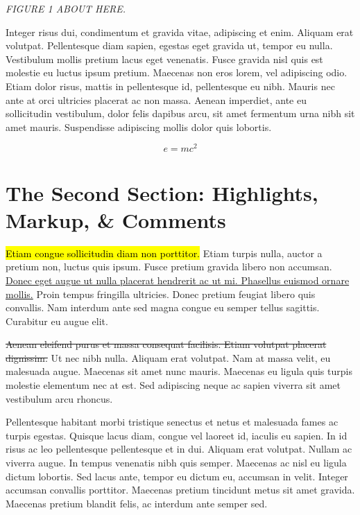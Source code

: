 \vspace{.25in}
\begin{center}
{\LARGE \textit{FIGURE 1 ABOUT HERE.}}
\end{center}

Integer risus dui, condimentum et gravida vitae, adipiscing et enim. Aliquam erat volutpat. \cite{lareau2003} Pellentesque diam sapien, egestas eget gravida ut, tempor eu nulla. Vestibulum mollis pretium lacus eget venenatis. Fusce gravida nisl quis est molestie eu luctus ipsum pretium. Maecenas non eros lorem, vel adipiscing odio. \cite{massey1993} Etiam dolor risus, mattis in pellentesque id, pellentesque eu nibh. Mauris nec ante at orci ultricies placerat ac non massa. Aenean imperdiet, ante eu sollicitudin vestibulum, dolor felis dapibus arcu, sit amet fermentum urna nibh sit amet mauris. \cite{mcpherson2001} Suspendisse adipiscing mollis dolor quis lobortis. \cite{meyer1977}

\begin{equation}
\label{eq:emc}
e = mc^2
\end{equation}

\section*{The Second Section: Highlights, Markup, \& Comments}

\hl{Etiam congue sollicitudin diam non porttitor.} Etiam turpis nulla, auctor a pretium non, luctus quis ipsum. Fusce pretium gravida libero non accumsan. \cite{putnam1995} \ul{Donec eget augue ut nulla placerat hendrerit ac ut mi. Phasellus euismod ornare mollis.} Proin tempus fringilla ultricies. Donec pretium feugiat libero quis convallis. Nam interdum ante sed magna congue eu semper tellus sagittis. Curabitur eu augue elit. \cite{raudenbush2004} 

\st{Aenean eleifend purus et massa consequat facilisis. Etiam volutpat placerat dignissim.} \cite{sampson1997} Ut nec nibh nulla. Aliquam erat volutpat. Nam at massa velit, eu malesuada augue. Maecenas sit amet nunc mauris. Maecenas eu ligula quis turpis molestie elementum nec at est. Sed adipiscing neque ac sapien viverra sit amet vestibulum arcu rhoncus. 

Pellentesque habitant morbi tristique senectus et netus et malesuada fames ac turpis egestas. Quisque lacus diam, congue vel laoreet id, iaculis eu sapien. \cite{swidler1986} In id risus ac leo pellentesque pellentesque et in dui. Aliquam erat volutpat. Nullam ac viverra augue. In tempus venenatis nibh quis semper. Maecenas ac nisl eu ligula dictum lobortis. Sed lacus ante, tempor eu dictum eu, accumsan in velit. Integer accumsan convallis porttitor. Maecenas pretium tincidunt metus sit amet gravida. Maecenas pretium blandit felis, ac interdum ante semper sed. \cite{west1987}

